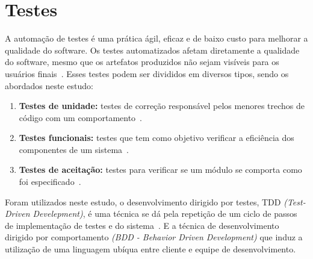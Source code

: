 \section{Testes}
\label{sec:testes}

A automação de testes é uma prática ágil, eficaz e de baixo custo para melhorar
a qualidade do software.
%
Os testes automatizados afetam diretamente a qualidade do software, mesmo que os artefatos  produzidos não sejam visíveis para os usuários finais~\cite{bernardo2011}.
Esses testes podem ser divididos em diversos tipos, sendo os abordados neste estudo:

\begin{enumerate}

\item \textbf{Testes de unidade:} testes de correção responsável pelos
menores trechos de código com um comportamento~\cite{bernardo2011}.

\item \textbf{Testes funcionais:} testes que tem como objetivo verificar a eficiência
dos componentes de um sistema~\cite{molinari2003}.

\item \textbf{Testes de aceitação:} testes para verificar se um módulo se comporta como foi especificado~\cite{martin2005}.

\end{enumerate}

Foram utilizados neste estudo, o desenvolvimento dirigido por testes, TDD \textit{(Test-Driven Develepment)}, é uma técnica se dá pela repetição de um ciclo de passos de implementação de testes e do sistema~\cite{koskela2007}.
%
E a técnica de desenvolvimento dirigido por comportamento \textit{(BDD - Behavior Driven Development)} que induz a utilização de uma linguagem ubíqua entre cliente e equipe de desenvolvimento. 


